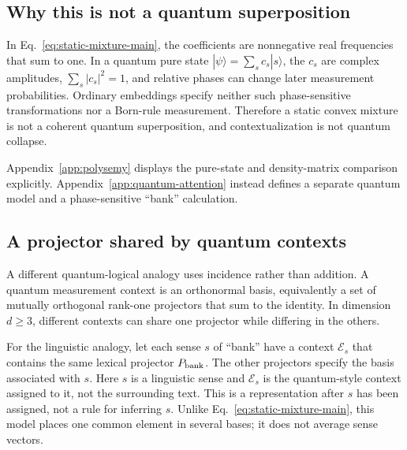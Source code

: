 \documentclass[
  aps,
  reprint,
  superscriptaddress,
  floatfix,
  nofootinbib,
  longbibliography
]{revtex4-2}
\begin{document}
\subsection{Why this is not a quantum superposition}

In Eq.~\eqref{eq:static-mixture-main}, the coefficients are nonnegative real
frequencies that sum to one.  In a quantum pure state
$|\psi\rangle=\sum_s c_s|s\rangle$, the $c_s$ are complex amplitudes,
$\sum_s|c_s|^2=1$, and relative phases can change later measurement
probabilities.  Ordinary embeddings specify neither such phase-sensitive
transformations nor a Born-rule measurement.  Therefore a static convex
mixture is not a coherent quantum superposition, and contextualization is not
quantum collapse.

Appendix~\ref{app:polysemy} displays the pure-state and density-matrix
comparison explicitly.  Appendix~\ref{app:quantum-attention} instead defines
a separate quantum model and a phase-sensitive ``bank'' calculation.

\subsection{A projector shared by quantum contexts}

A different quantum-logical analogy uses incidence rather than addition.  A
quantum measurement context is an orthonormal basis, equivalently a set of
mutually orthogonal rank-one projectors that sum to the identity.  In
dimension $d\geq3$, different contexts can share one projector while differing
in the others.

For the linguistic analogy, let each sense $s$ of ``bank'' have a context
$\mathcal E_s$ that contains the same lexical projector $P_{\rm bank}$.  The
other projectors specify the basis associated with $s$.  Here $s$ is a
linguistic sense and $\mathcal E_s$ is the quantum-style context assigned to
it, not the surrounding text.  This is a representation after $s$ has been
assigned, not a rule for inferring $s$.  Unlike
Eq.~\eqref{eq:static-mixture-main}, this model places one common element in
several bases; it does not average sense vectors.
\end{document}
